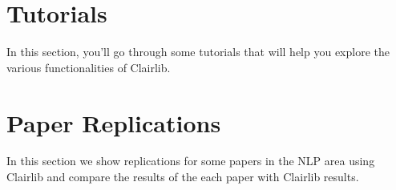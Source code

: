 \section{Tutorials}

In this section, you'll go through some tutorials that will help you explore the various functionalities of Clairlib.











































\section{Paper Replications}

In this section we show replications for some papers in the NLP area using Clairlib and compare the results of the each paper with Clairlib results.





